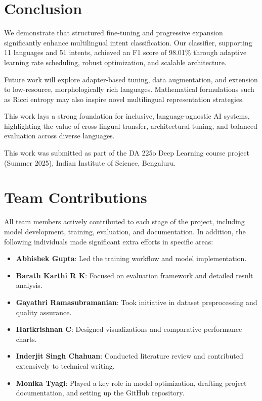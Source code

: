 \documentclass{ecai}
\begin{document}
\section{Conclusion}
We demonstrate that structured fine-tuning and progressive expansion significantly enhance multilingual intent classification. Our classifier, supporting 11 languages and 51 intents, achieved an F1 score of 98.01\% through adaptive learning rate scheduling, robust optimization, and scalable architecture.

Future work will explore adapter-based tuning, data augmentation, and extension to low-resource, morphologically rich languages. Mathematical formulations such as Ricci entropy \cite{perelman2002entropy} may also inspire novel multilingual representation strategies.

This work lays a strong foundation for inclusive, language-agnostic AI systems, highlighting the value of cross-lingual transfer, architectural tuning, and balanced evaluation across diverse languages.


\begin{ack}
This work was submitted as part of the DA 225o Deep Learning course project (Summer 2025), Indian Institute of Science, Bengaluru.
\end{ack}




\newpage
\section*{Team Contributions}
All team members actively contributed to each stage of the project, including model development, training, evaluation, and documentation. In addition, the following individuals made significant extra efforts in specific areas:

\begin{itemize}
    \item \textbf{Abhishek Gupta}: Led the training workflow and model implementation.
    \item \textbf{Barath Karthi R K}: Focused on evaluation framework and detailed result analysis.
    \item \textbf{Gayathri Ramasubramanian}: Took initiative in dataset preprocessing and quality assurance.
    \item \textbf{Harikrishnan C}: Designed visualizations and comparative performance charts.
    \item \textbf{Inderjit Singh Chahuan}: Conducted literature review and contributed extensively to technical writing.
    \item \textbf{Monika Tyagi}: Played a key role in model optimization, drafting project documentation, and setting up the GitHub repository.
\end{itemize}
\end{document}
